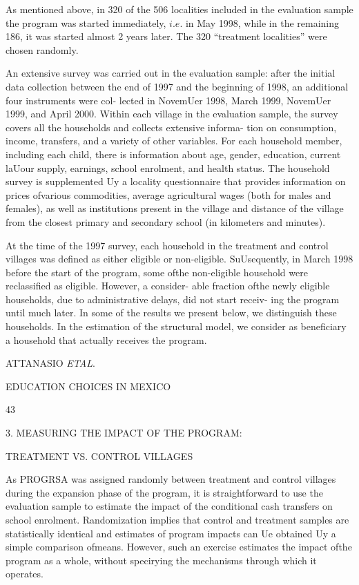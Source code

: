 As mentioned above, in 320 of the 506 localities included in the evaluation sample the program was started immediately, $i.e$. in May 1998, while in the remaining 186, it was started almost 2 years later. The 320 ``treatment localities'' were chosen randomly.

An extensive survey was carried out in the evaluation sample: after the initial data collection between the end of 1997 and the beginning of 1998, an additional four instruments were col- lected in NovemUer 1998, March 1999, NovemUer 1999, and April 2000. Within each village in the evaluation sample, the survey covers all the households and collects extensive informa- tion on consumption, income, transfers, and a variety of other variables. For each household member, including each child, there is information about age, gender, education, current laUour supply, earnings, school enrolment, and health status. The household survey is supplemented Uy a locality questionnaire that provides information on prices ofvarious commodities, average agricultural wages (both for males and females), as well as institutions present in the village and distance of the village from the closest primary and secondary school (in kilometers and minutes).

At the time of the 1997 survey, each household in the treatment and control villages was defined as either eligible or non-eligible. SuUsequently, in March 1998 before the start of the program, some ofthe non-eligible household were reclassified as eligible. However, a consider- able fraction ofthe newly eligible households, due to administrative delays, did not start receiv- ing the program until much later. In some of the results we present below, we distinguish these households. In the estimation of the structural model, we consider as beneficiary a household that actually receives the program.

ATTANASIO {\it ETAL}.

EDUCATION CHOICES IN MEXICO

43

3. MEASURING THE IMPACT OF THE PROGRAM:

TREATMENT VS. CONTROL VILLAGES

As PROGRSA was assigned randomly between treatment and control villages during the expansion phase of the program, it is straightforward to use the evaluation sample to estimate the impact of the conditional cash transfers on school enrolment. Randomization implies that control and treatment samples are statistically identical and estimates of program impacts can Ue obtained Uy a simple comparison ofmeans. However, such an exercise estimates the impact ofthe program as a whole, without specirying the mechanisms through which it operates.

